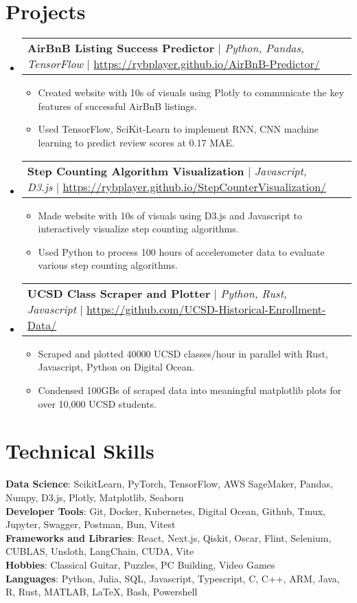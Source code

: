 \documentclass[letterpaper,12pt]{article}
\makeatletter
\newcommand{\resumeItem}[1]{
  \item\small{
    {#1 \vspace{-5pt}}
  }
}
\newcommand{\resumeProjectHeading}[2]{
    \item
    \begin{tabular*}{0.97\textwidth}{l@{\extracolsep{\fill}}r}
      \small#1 &
    \footnotesize#2 \\
    \end{tabular*}\vspace{-10pt}
}
\newcommand{\resumeSubHeadingListStart}{\begin{itemize}[leftmargin=0.15in, label={}]}
\newcommand{\resumeSubHeadingListEnd}{\end{itemize}}
\newcommand{\resumeItemListStart}{\begin{itemize}}
\newcommand{\resumeItemListEnd}{\end{itemize}\vspace{-5pt}}
\makeatother
\begin{document}
\section{Projects}
    \resumeSubHeadingListStart
    \resumeProjectHeading
        {\textbf{AirBnB Listing Success Predictor} $|$ \emph{Python, Pandas, TensorFlow} $|$ \footnotesize\href{https://rybplayer.github.io/AirBnB-Predictor/}{https://rybplayer.github.io/AirBnB-Predictor/}}{}
        \resumeItemListStart
        \resumeItem{Created website with 10s of visuals using Plotly to communicate the key features of successful AirBnB listings.}
        \resumeItem{Used TensorFlow, SciKit-Learn to implement RNN, CNN machine learning to predict review scores at 0.17 MAE.}
        \resumeItemListEnd
    \resumeProjectHeading
        {\textbf{Step Counting Algorithm Visualization} $|$ \emph{Javascript, D3.js} $|$ \footnotesize\href{https://rybplayer.github.io/StepCounterVisualization/}{https://rybplayer.github.io/StepCounterVisualization/}}{}
        \resumeItemListStart
        \resumeItem{Made website with 10s of visuals using D3.js and Javascript to interactively visualize step counting algorithms.}
        \resumeItem{Used Python to process 100 hours of accelerometer data to evaluate various step counting algorithms.}
        \resumeItemListEnd
    \resumeProjectHeading
        {\textbf{UCSD Class Scraper and Plotter} $|$ \emph{Python, Rust, Javascript} $|$ \footnotesize\href{https://github.com/UCSD-Historical-Enrollment-Data/}{https://github.com/UCSD-Historical-Enrollment-Data/}}{}
        \resumeItemListStart
        \resumeItem{Scraped and plotted 40000 UCSD classes/hour in parallel with Rust, Javascript, Python on Digital Ocean.}
        \resumeItem{Condensed 100GBs of scraped data into meaningful matplotlib plots for over 10,000 UCSD students.}
        \resumeItemListEnd
    \resumeSubHeadingListEnd

\section{Technical Skills}
 \begin{itemize}[leftmargin=0.15in, label={}]
    \small{\item{
    \textbf{Data Science}{: 
    ScikitLearn, PyTorch, TensorFlow, AWS SageMaker, Pandas, Numpy, D3.js, Plotly, Matplotlib, Seaborn
    } \\
    \textbf{Developer Tools}{: 
    Git, Docker, Kubernetes, Digital Ocean, Github, Tmux, Jupyter, Swagger, Postman, Bun, Vitest
    } \\
    \textbf{Frameworks and Libraries}{: 
    React, Next.js, Qiskit, Oscar, Flint, Selenium, CUBLAS, Unsloth, LangChain, CUDA, Vite
    } \\
    \textbf{Hobbies}{: 
    Classical Guitar, Puzzles, PC Building, Video Games
    } \\
    \textbf{Languages}{: 
    Python, Julia, SQL, Javascript, Typescript, C, C++, ARM, Java, R, Rust, MATLAB, LaTeX, Bash, Powershell
    } \\
    }}
 \end{itemize}
\end{document}
